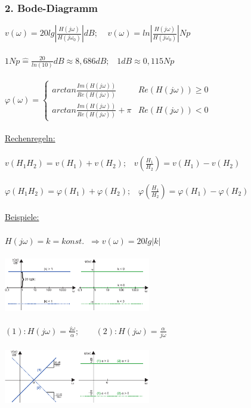 \documentclass[a4paper,twocolumn,10pt]{article}
\newcommand{\entspr}{\widehat{=}}
\begin{document}
\subsubsection*{2. Bode-Diagramm}
$v(\omega)=20lg\left|\frac{H(j\omega)}{H(j\omega_0)}\right| dB;\;\;\;\;v(\omega)=ln\left|\frac{H(j\omega)}{H(j\omega_0)}\right| Np$\\\\
$1Np\entspr \frac{20}{ln(10)}dB\approx 8,686 dB;\;\;\;1dB\approx 0,115Np$\\\\
$\varphi(\omega)=\begin{cases}arctan\frac{Im(H(j\omega))}{Re(H(j\omega))} & Re(H(j\omega))\geq 0 \\arctan\frac{Im(H(j\omega))}{Re(H(j\omega))}+\pi & Re(H(j\omega))<0\end{cases}$\\\\
\underline{Rechenregeln:}\\\\
$v(H_1H_2)=v(H_1)+v(H_2);\;\;\;v(\frac{H_1}{H_2})=v(H_1)-v(H_2)$\\\\
$\varphi(H_1H_2)=\varphi(H_1)+\varphi(H_2);\;\;\;\varphi(\frac{H_1}{H_2})=\varphi(H_1)-\varphi(H_2)$\\\\
\underline{Beispiele:}\\\\
$H(j\omega)=k=konst.\;\;\Rightarrow v(\omega)=20lg|k|$\\\\
\includegraphics[width=0.48\textwidth]{Grafiken/Bode-Diagramm1}\\\\
$(1): H(j\omega)=\frac{j\omega}{\alpha};\;\;\;\;\;\;\;(2): H(j\omega)=\frac{\alpha}{j\omega}$\\\\
\includegraphics[width=0.48\textwidth]{Grafiken/Bode-Diagramm2}\\\\
\end{document}
